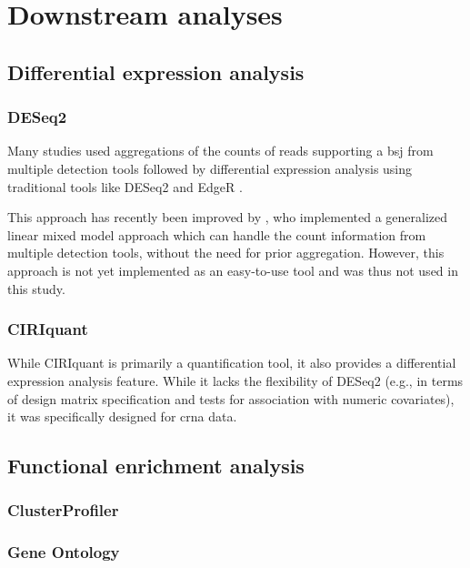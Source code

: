 \section{Downstream analyses}

\subsection{Differential expression analysis}

\subsubsection{DESeq2}

Many studies used aggregations of the counts of reads supporting a \gls{bsj}
from multiple detection tools followed by differential expression analysis
using traditional tools like DESeq2\supercite{love_moderated_2014} and
EdgeR\supercite{robinson_edger_2010}
\supercite{digby_nf-corecircrna_2023,gaffo_sensitive_2022}.

This approach has recently been improved by \textcite{buratin_detecting_2022},
who implemented a generalized linear mixed model approach which can handle the
count information from multiple detection tools, without the need for prior
aggregation\supercite{digby_computational_2024}.
However, this approach is not yet implemented as an easy-to-use tool and was
thus not used in this study.

\subsubsection{CIRIquant}

While CIRIquant is primarily a quantification tool, it also provides a
differential expression analysis feature.
While it lacks the flexibility of DESeq2 (e.g., in terms of design matrix
specification and tests for association with numeric covariates), it was
specifically designed for \gls{crna} data.

\subsection{Functional enrichment analysis}

\subsubsection{ClusterProfiler}

\subsubsection{Gene Ontology}